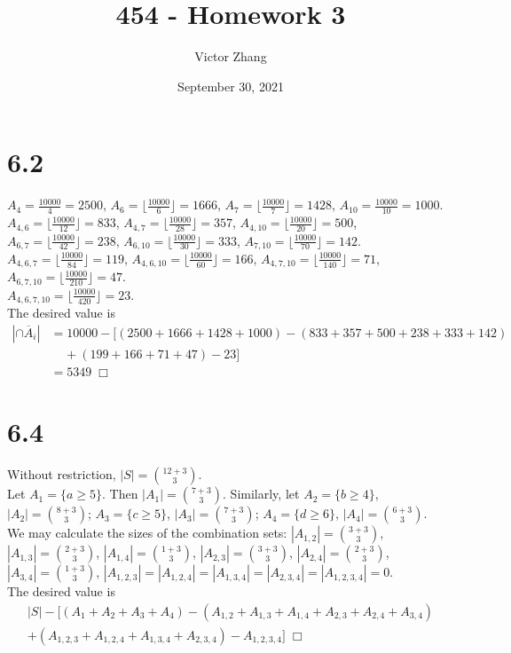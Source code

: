 \documentclass{article}
\title{454 - Homework 3}
\author{Victor Zhang}
\date{September 30, 2021}
\begin{document}
\maketitle

\section*{6.2}
$A_4 = \frac{10000}{4} = 2500$, $A_6 = \lfloor \frac{10000}{6} \rfloor = 1666$, $A_7 = \lfloor \frac{10000}{7} \rfloor = 1428$, $A_{10} = \frac{10000}{10} = 1000$.\\
$A_{4,6} = \lfloor \frac{10000}{12} \rfloor = 833$, $A_{4,7} = \lfloor \frac{10000}{28} \rfloor = 357$, $A_{4,10} = \lfloor \frac{10000}{20} \rfloor = 500$, $A_{6,7} = \lfloor \frac{10000}{42} \rfloor = 238$, $A_{6,10} = \lfloor \frac{10000}{30} \rfloor = 333$, $A_{7,10} = \lfloor \frac{10000}{70} \rfloor = 142$.\\
$A_{4,6,7} = \lfloor \frac{10000}{84} \rfloor = 119$, $A_{4,6,10} = \lfloor \frac{10000}{60} \rfloor = 166$, $A_{4,7,10} = \lfloor \frac{10000}{140} \rfloor = 71$, $A_{6,7,10} = \lfloor \frac{10000}{210} \rfloor = 47$.\\
$A_{4,6,7,10} = \lfloor \frac{10000}{420} \rfloor = 23$.\\
The desired value is
\begin{equation*}
\begin{split}
|\cap \overline{A}_i| &= 10000 - [(2500 + 1666 + 1428 + 1000) - (833 + 357 + 500 + 238 + 333 + 142)\\
& \;\;\;\;+ (199 + 166 + 71 + 47) - 23]\\
&= 5349 \; \Box
\end{split}
\end{equation*}

\section*{6.4}
Without restriction, $|S| = \binom{12+3}{3}$.\\
Let $A_1 = \{a \geq 5\}$. Then $|A_1| = \binom{7+3}{3}$. Similarly, let $A_2 = \{b \geq 4\}$, $|A_2| = \binom{8+3}{3}$; $A_3 = \{c \geq 5\}$, $|A_3| = \binom{7+3}{3}$; $A_4 = \{d \geq 6\}$, $|A_4| = \binom{6+3}{3}$.\\
We may calculate the sizes of the combination sets: $|A_{1,2}| = \binom{3+3}{3}$, $|A_{1,3}| = \binom{2+3}{3}$, $|A_{1,4}| = \binom{1+3}{3}$, $|A_{2,3}| = \binom{3+3}{3}$, $|A_{2,4}| = \binom{2+3}{3}$, $|A_{3,4}| = \binom{1+3}{3}$, $|A_{1,2,3}| = |A_{1,2,4}| = |A_{1,3,4}| = |A_{2,3,4}| = |A_{1,2,3,4}| = 0$.\\
The desired value is
\begin{gather*}
|S| - [(A_1 + A_2 + A_3 + A_4) - (A_{1,2} + A_{1,3} + A_{1,4} + A_{2,3} + A_{2,4} + A_{3,4})\\ + (A_{1,2,3} + A_{1,2,4} + A_{1,3,4} + A_{2,3,4}) - A_{1,2,3,4}] \; \Box
\end{gather*}
\end{document}
